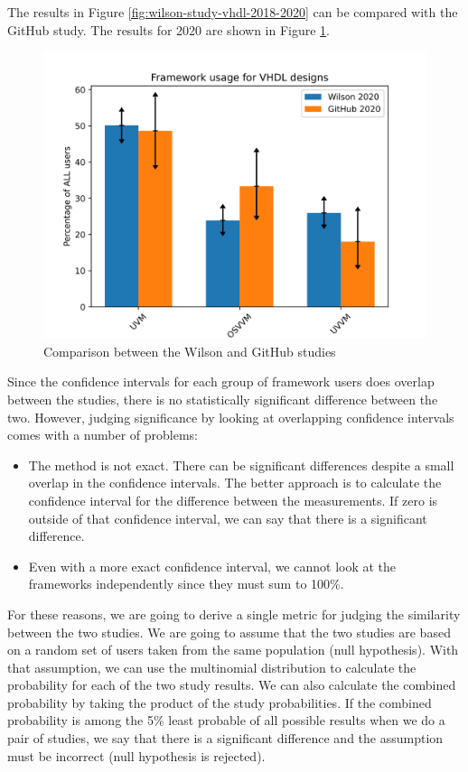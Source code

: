 \documentclass[]{article}
\providecommand{\tightlist}{%
  \setlength{\itemsep}{0pt}\setlength{\parskip}{0pt}}
\begin{document}
The results in Figure \ref{fig:wilson-study-vhdl-2018-2020} can be compared with the GitHub study. The results for 2020 are shown in Figure \ref{fig:github-wilson-comparison-2020}.

\begin{figure}

{\centering \includegraphics[width=0.85\linewidth]{img/github_wilson_comparison_2020} 

}

\caption{Comparison between the Wilson and GitHub studies}\label{fig:github-wilson-comparison-2020}
\end{figure}

Since the confidence intervals for each group of framework users does overlap between the studies, there is no statistically significant difference between the two. However, judging significance by looking at overlapping confidence intervals comes with a number of problems:

\begin{itemize}
\tightlist
\item
  The method is not exact. There can be significant differences despite a small overlap in the confidence intervals. The better approach is to calculate the confidence interval for the difference between the measurements. If zero is outside of that confidence interval, we can say that there is a significant difference.
\item
  Even with a more exact confidence interval, we cannot look at the frameworks independently since they must sum to 100\%.
\end{itemize}

For these reasons, we are going to derive a single metric for judging the similarity between the two studies. We are going to assume that the two studies are based on a random set of users taken from the same population (null hypothesis). With that assumption, we can use the multinomial distribution to calculate the probability for each of the two study results. We can also calculate the combined probability by taking the product of the study probabilities. If the combined probability is among the 5\% least probable of all possible results when we do a pair of studies, we say that there is a significant difference and the assumption must be incorrect (null hypothesis is rejected).
\end{document}
